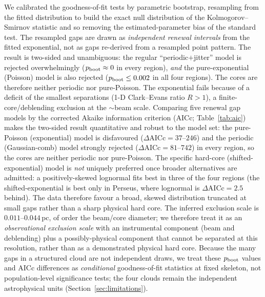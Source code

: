 \documentclass[usenatbib,twoside,twocolumn]{mnras}
\begin{document}
We calibrated the goodness-of-fit tests by parametric bootstrap, resampling from the fitted distribution to build the exact null distribution of the Kolmogorov--Smirnov statistic and so removing the estimated-parameter bias of the standard test. The resampled gaps are drawn as \emph{independent renewal intervals} from the fitted exponential, not as gaps re-derived from a resampled point pattern. The result is two-sided and unambiguous: the regular ``periodic$+$jitter'' model is rejected overwhelmingly ($p_{\rm boot}\approx0$ in every region), \emph{and} the pure-exponential (Poisson) model is also rejected ($p_{\rm boot}\leq0.002$ in all four regions). The cores are therefore neither periodic nor pure-Poisson. The exponential fails because of a deficit of the smallest separations (1-D Clark--Evans ratio $R>1$), a finite-core/deblending exclusion at the $\sim$beam scale. Comparing five renewal gap models by the corrected Akaike information criterion (AICc; Table~\ref{tab:aic}) makes the two-sided result quantitative and robust to the model set: the pure-Poisson (exponential) model is disfavoured ($\Delta$AICc$=37$--$246$) and the periodic (Gaussian-comb) model strongly rejected ($\Delta$AICc$=81$--$742$) in every region, so the cores are neither periodic nor pure-Poisson. The specific hard-core (shifted-exponential) model is \emph{not} uniquely preferred once broader alternatives are admitted: a positively-skewed lognormal fits best in three of the four regions (the shifted-exponential is best only in Perseus, where lognormal is $\Delta$AICc$=2.5$ behind). The data therefore favour a broad, skewed distribution truncated at small gaps rather than a sharp physical hard core. The inferred exclusion scale is $0.011$--$0.044$\,pc, of order the beam/core diameter; we therefore treat it as an \emph{observational exclusion scale} with an instrumental component (beam and deblending) plus a possibly-physical component that cannot be separated at this resolution, rather than as a demonstrated physical hard core. Because the many gaps in a structured cloud are not independent draws, we treat these $p_{\rm boot}$ values and AICc differences as \emph{conditional} goodness-of-fit statistics at fixed skeleton, not population-level significance tests; the four clouds remain the independent astrophysical units (Section~\ref{sec:limitations}).
\end{document}
